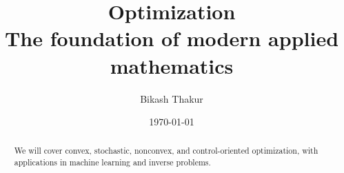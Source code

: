 \documentclass[11pt]{article}
\title{%
{\sffamily\huge\bfseries\color{DarkNavy} Optimization}\\[6pt]
{\sffamily\large\color{AccentGray} The foundation of modern applied mathematics}
}
\author{{\sffamily Bikash Thakur}}
\date{{\sffamily\small\color{AccentGray} \today}}
\begin{document}
\pagecolor{OffWhite}
\color{DarkNavy}

\maketitle
\thispagestyle{plain}

\begin{abstract}
\noindent
We will cover convex, stochastic, nonconvex, and control-oriented optimization, with applications in machine learning and inverse problems.
\end{abstract}

\tableofcontents
\newpage



\printindex
\end{document}

